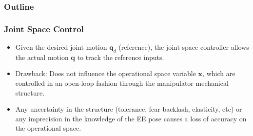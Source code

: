 \documentclass[10pt, aspectratio=169]{beamer}
\theoremstyle{remark}
\theoremstyle{definition}
\begin{document}
\begin{frame}
	\frametitle{Outline} %
	\tableofcontents[currentsection] %
\end{frame}

\begin{frame}[allowframebreaks]
	\frametitle{Joint Space Control} 

    \begin{itemize}
        \item Given the desired joint motion $\mathbf{q}_d$ (reference), the joint space controller allows the actual motion $\mathbf{q}$ to \textcolor{uma_blue_light}{track the reference} inputs.
        \item \textcolor{uma_blue_light}{Drawback:} Does not influence the operational space variable $\mathbf{x}$, which are controlled in an open-loop fashion through the manipulator mechanical structure.
        \item Any uncertainty in the structure (tolerance, fear backlash, elasticity, etc) or any imprecision in the knowledge of the EE pose causes a loss of accuracy on the operational space.
    \end{itemize}

    \framebreak


\end{frame}
\end{document}
